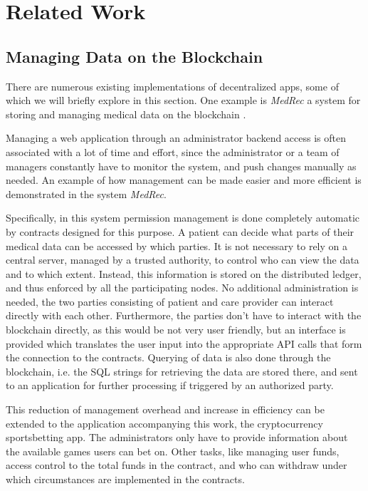 \chapter{Related Work}
\label{cha:related_work}
\section{Managing Data on the Blockchain}
There are numerous existing implementations of decentralized apps, some of which we will briefly explore in this section. One example is \emph{MedRec} a system for storing and managing medical data on the blockchain \cite{azaria2016medrec}.

Managing a web application through an administrator backend access is often associated with a lot of time and effort, since the administrator or a team of managers constantly have to monitor the system, and push changes manually as needed. An example of how management can be made easier and more efficient is demonstrated in the system \emph{MedRec}.

Specifically, in this system permission management is done completely automatic by contracts designed for this purpose. A patient can decide what parts of their medical data can be accessed by which parties. It is not necessary to rely on a central server, managed by a trusted authority, to control who can view the data and to which extent. Instead, this information is stored on the distributed ledger, and thus enforced by all the participating nodes. No additional administration is needed, the two parties consisting of patient and care provider can interact directly with each other. Furthermore, the parties don't have to interact with the blockchain directly, as this would be not very user friendly, but an interface is provided which translates the user input into the appropriate API calls that form the connection to the contracts. Querying of data is also done through the blockchain, i.e. the SQL strings for retrieving the data are stored there, and sent to an application for further processing if triggered by an authorized party.

This reduction of management overhead and increase in efficiency can be extended to the application accompanying this work, the cryptocurrency sportsbetting app. The administrators only have to provide information about the available games users can bet on. Other tasks, like managing user funds, access control to the total funds in the contract, and who can withdraw under which circumstances are implemented in the contracts.

